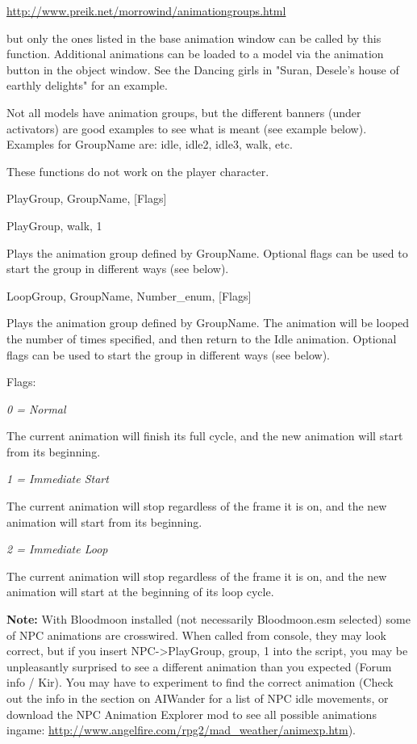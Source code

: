 \documentclass[
]{article}
\begin{document}
\href{http://morrowind.preik.net/animationgroups.html}{http://www.preik.net/morrowind/animationgroups.html}

but only the ones listed in the base animation window can be called by
this function. Additional animations can be loaded to a model via the
animation button in the object window. See the Dancing girls in "Suran,
Desele's house of earthly delights" for an example.

Not all models have animation groups, but the different banners (under
activators) are good examples to see what is meant (see example below).
Examples for GroupName are: idle, idle2, idle3, walk, etc.

These functions do not work on the player character.

PlayGroup, GroupName, {[}Flags{]}

PlayGroup, walk, 1

Plays the animation group defined by GroupName. Optional flags can be
used to start the group in different ways (see below).

LoopGroup, GroupName, Number\_enum, {[}Flags{]}

Plays the animation group defined by GroupName. The animation will be
looped the number of times specified, and then return to the Idle
animation. Optional flags can be used to start the group in different
ways (see below).

Flags:

\emph{0 = Normal}

The current animation will finish its full cycle, and the new animation
will start from its beginning.

\emph{1 = Immediate Start}

The current animation will stop regardless of the frame it is on, and
the new animation will start from its beginning.

\emph{2 = Immediate Loop}

The current animation will stop regardless of the frame it is on, and
the new animation will start at the beginning of its loop cycle.

\textbf{Note:} With Bloodmoon installed (not necessarily Bloodmoon.esm
selected) some of NPC animations are crosswired. When called from
console, they may look correct, but if you insert
NPC-\textgreater PlayGroup, group, 1 into the script, you may be
unpleasantly surprised to see a different animation than you expected
(Forum info / Kir). You may have to experiment to find the correct
animation (Check out the info in the section on AIWander for a list of
NPC idle movements, or download the NPC Animation Explorer mod to see
all possible animations ingame:
\url{http://www.angelfire.com/rpg2/mad_weather/animexp.htm}).
\end{document}
